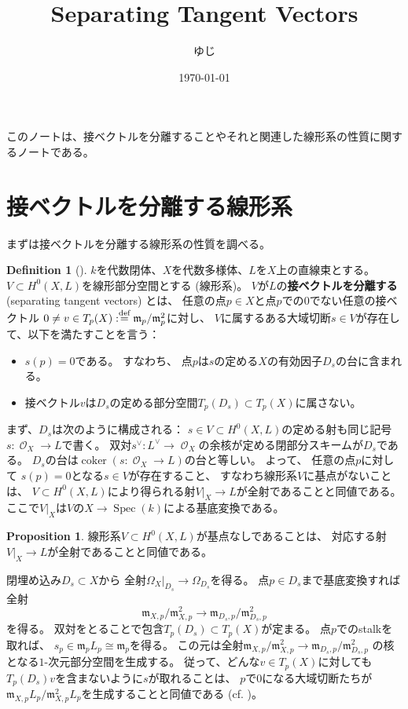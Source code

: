 \documentclass[uplatex]{jsarticle}
\title{Separating Tangent Vectors}
\author{ゆじ}
\date{\today}
\theoremstyle{definition}
\newtheorem{prop}[prop]{Proposition}
\newtheorem{defi}[defi]{Definition}
\DeclareMathOperator{\coker}{\mathrm{coker}}
\DeclareMathOperator{\Spec}{\mathrm{Spec}}
\newcommand{\mcO}{\mathcal{O}}
\DeclareMathOperator{\OOO}{\mcO}
\newcommand{\OX}{{\OOO_X}}
\def\dfn{:\overset{\mbox{{\scriptsize def}}}{=}}
\begin{document}
\maketitle


このノートは、接ベクトルを分離することやそれと関連した線形系の性質に関するノートである。

\section{接ベクトルを分離する線形系}


まずは接ベクトルを分離する線形系の性質を調べる。


\begin{defi}[{\cite[Remark II.7.8.2]{Ha}}]
  \(k\)を代数閉体、\(X\)を代数多様体、\(L\)を\(X\)上の直線束とする。
  \(V\subset H^0(X,L)\)を線形部分空間とする (線形系)。
  \(V\)が\(L\)の\textbf{接ベクトルを分離する} (separating tangent vectors)
  とは、
  任意の点\(p\in X\)と点\(p\)での\(0\)でない任意の接ベクトル
  \(0\neq v\in T_p(X)\dfn \mathfrak{m}_p/\mathfrak{m}_p^2\)に対し、
  \(V\)に属するある大域切断\(s\in V\)が存在して、以下を満たすことを言う：
  \begin{itemize}
    \item
    \(s(p)=0\)である。
    すなわち、
    点\(p\)は\(s\)の定める\(X\)の有効因子\(D_s\)の台に含まれる。
    \item
    接ベクトル\(v\)は\(D_s\)の定める部分空間\(T_p(D_s)\subset T_p(X)\)に属さない。
  \end{itemize}
\end{defi}


まず、\(D_s\)は次のように構成される：
\(s\in V\subset H^0(X,L)\)の定める射も同じ記号
\(s:\OX\to L\)で書く。
双対\(s^{\vee}:L^{\vee}\to \OX\)の余核が定める閉部分スキームが\(D_s\)である。
\(D_s\)の台は\(\coker(s:\OX\to L)\)の台と等しい。
よって、
任意の点\(p\)に対して
\(s(p)=0\)となる\(s\in V\)が存在すること、
すなわち線形系\(V\)に基点がないことは、
\(V\subset H^0(X,L)\)により得られる射\(V|_X\to L\)が全射であることと同値である。
ここで\(V|_X\)は\(V\)の\(X\to \Spec (k)\)による基底変換である。

\begin{prop}\label{prop: BPF surj}
  線形系\(V\subset H^0(X,L)\)が基点なしであることは、
  対応する射\(V|_X\to L\)が全射であることと同値である。
\end{prop}



閉埋め込み\(D_s\subset X\)から
全射\(\Omega_X|_{D_s}\to \Omega_{D_s}\)を得る。
点\(p\in D_s\)まで基底変換すれば全射
\[\mathfrak{m}_{X,p}/\mathfrak{m}_{X,p}^2\to
\mathfrak{m}_{D_s,p}/\mathfrak{m}_{D_s,p}^2\]
を得る。
双対をとることで包含\(T_p(D_s)\subset T_p(X)\)が定まる。
点\(p\)でのstalkを取れば、
\(s_p\in \mathfrak{m}_pL_p\cong \mathfrak{m}_p\)を得る。
この元は全射\(\mathfrak{m}_{X,p}/\mathfrak{m}_{X,p}^2\to
\mathfrak{m}_{D_s,p}/\mathfrak{m}_{D_s,p}^2\)
の核となる\(1\)-次元部分空間を生成する。
従って、どんな\(v\in T_p(X)\)に対しても\(T_p(D_s)\)\(v\)を含まないように\(s\)が取れることは、
\(p\)で\(0\)になる大域切断たちが
\(\mathfrak{m}_{X,p}L_p/\mathfrak{m}_{X,p}^2L_p\)を生成することと同値である
(cf. \cite[Theorem 7.3.(2)]{Ha})。
\end{document}
